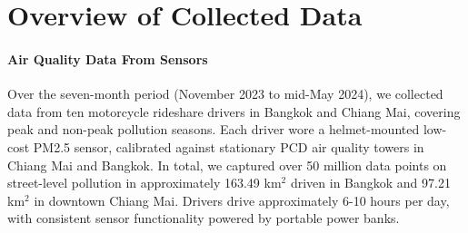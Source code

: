 \section{Overview of Collected Data}
\label{sec:result-overview-data}

\paragraph{Air Quality Data From Sensors}
Over the seven-month period (November 2023 to mid-May 2024), we collected data from ten motorcycle rideshare drivers in Bangkok and Chiang Mai, covering peak and non-peak pollution seasons.
Each driver wore a helmet-mounted low-cost PM2.5 sensor, calibrated against stationary PCD air quality towers in Chiang Mai and Bangkok.
In total, we captured over 50 million data points on street-level pollution in approximately 163.49 km$^2$ driven in Bangkok and 97.21 km$^2$ in downtown Chiang Mai.
Drivers drive approximately 6-10 hours per day, with consistent sensor functionality powered by portable power banks.



